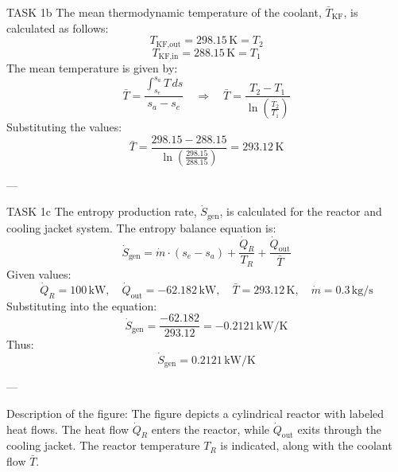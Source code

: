 TASK 1b  
The mean thermodynamic temperature of the coolant, \( \bar{T}_{\text{KF}} \), is calculated as follows:  
\[
T_{\text{KF,out}} = 298.15 \, \text{K} = T_{2}
\]  
\[
T_{\text{KF,in}} = 288.15 \, \text{K} = T_{1}
\]  
The mean temperature is given by:  
\[
\bar{T} = \frac{\int_{s_e}^{s_a} T \, ds}{s_a - s_e} \quad \Rightarrow \quad \bar{T} = \frac{T_2 - T_1}{\ln\left(\frac{T_2}{T_1}\right)}
\]  
Substituting the values:  
\[
\bar{T} = \frac{298.15 - 288.15}{\ln\left(\frac{298.15}{288.15}\right)} = 293.12 \, \text{K}
\]  

---

TASK 1c  
The entropy production rate, \( \dot{S}_{\text{gen}} \), is calculated for the reactor and cooling jacket system. The entropy balance equation is:  
\[
\dot{S}_{\text{gen}} = \dot{m} \cdot (s_e - s_a) + \frac{\dot{Q}_R}{T_R} + \frac{\dot{Q}_{\text{out}}}{\bar{T}}
\]  
Given values:  
\[
\dot{Q}_R = 100 \, \text{kW}, \quad \dot{Q}_{\text{out}} = -62.182 \, \text{kW}, \quad \bar{T} = 293.12 \, \text{K}, \quad \dot{m} = 0.3 \, \text{kg/s}
\]  
Substituting into the equation:  
\[
\dot{S}_{\text{gen}} = \frac{-62.182}{293.12} = -0.2121 \, \text{kW/K}
\]  
Thus:  
\[
\dot{S}_{\text{gen}} = 0.2121 \, \text{kW/K}
\]  

---

Description of the figure:  
The figure depicts a cylindrical reactor with labeled heat flows. The heat flow \( \dot{Q}_R \) enters the reactor, while \( \dot{Q}_{\text{out}} \) exits through the cooling jacket. The reactor temperature \( T_R \) is indicated, along with the coolant flow \( \bar{T} \).